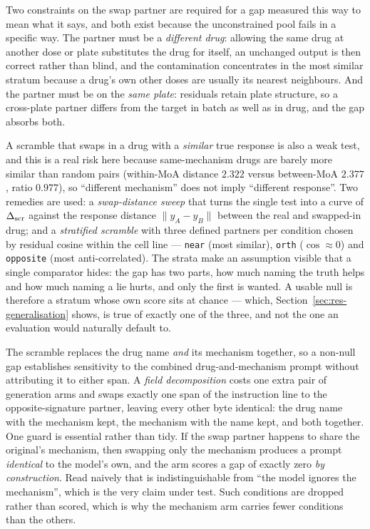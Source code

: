 Two constraints on the swap partner are required for a gap measured this way to mean what it says,
and both exist because the unconstrained pool fails in a specific way. The partner must be a
\emph{different drug}: allowing the same drug at another dose or plate substitutes the drug for
itself, an unchanged output is then correct rather than blind, and the contamination concentrates
in the most similar stratum because a drug's own other doses are usually its nearest neighbours.
And the partner must be on the \emph{same plate}: residuals retain plate structure, so a
cross-plate partner differs from the target in batch as well as in drug, and the gap absorbs both.

A scramble that swaps in a drug with a \emph{similar} true response is also a weak test, and this is
a real risk here because same-mechanism drugs are barely more similar than random pairs (within-MoA
distance $2.322$ versus between-MoA $2.377$, ratio $0.977$), so ``different mechanism'' does not
imply ``different response''. Two remedies are used: a \emph{swap-distance sweep} that turns the
single test into a curve of $\Delta_{\textrm{scr}}$ against the response distance $\lVert y_A - y_B \rVert$ between
the real and swapped-in drug; and a \emph{stratified scramble} with three defined partners per
condition chosen by residual cosine within the cell line --- \texttt{near} (most similar),
\texttt{orth} ($\cos\approx0$) and \texttt{opposite} (most anti-correlated). The strata make an
assumption visible that a single comparator hides: the gap has two parts, how much naming the truth
helps and how much naming a lie hurts, and only the first is wanted. A usable null is therefore a
stratum whose own score sits at chance --- which, Section~\ref{sec:res-generalisation} shows, is
true of exactly one of the three, and not the one an evaluation would naturally default to.



The scramble replaces the drug name \emph{and} its mechanism together, so a non-null gap
establishes sensitivity to the combined drug-and-mechanism prompt without attributing it to either
span. A \emph{field decomposition} costs one extra pair of generation arms and swaps exactly one
span of the instruction line to the opposite-signature partner, leaving every other byte identical:
the drug name with the mechanism kept, the mechanism with the name kept, and both together. One
guard is essential rather than tidy. If the swap partner happens to share the original's mechanism,
then swapping only the mechanism produces a prompt \emph{identical} to the model's own, and the arm
scores a gap of exactly zero \emph{by construction}. Read naively that is indistinguishable from
``the model ignores the mechanism'', which is the very claim under test. Such conditions are
dropped rather than scored, which is why the mechanism arm carries fewer conditions than the others.

